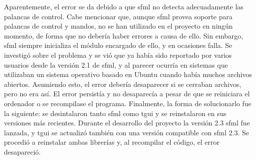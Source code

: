 	Aparentemente, el error se da debido a que \acrshort{sfml} no detecta adecuadamente las palancas de control. Cabe mencionar que, aunque \acrshort{sfml} provea soporte para palancas de control y mandos, no se han utilizado en el proyecto en ningún momento, de forma que no debería haber errores a causa de ello. Sin embargo, \acrshort{sfml} siempre inicializa el módulo encargado de ello, y en ocasiones falla. Se investigó sobre el problema y se vió que ya había sido reportado por varios usuarios desde la versión 2.1 de \acrshort{sfml}, y al parecer ocurría en sistemas que utilizaban un sistema operativo basado en Ubuntu cuando había muchos archivos abiertos. Asumiendo esto, el error debería desaparecer si se cerraban archivos, pero no era así. El error persistía y no desaparecía a pesar de que se reiniciara el ordenador o se recompilase el programa. Finalmente, la forma de solucionarlo fue la siguiente: se desintalaron tanto \acrshort{sfml} como \acrshort{tgui} y se reinstalaron en sus versiones más recientes. Durante el desarrollo del proyecto la versión 2.3 \acrshort{sfml} fue lanzada, y \acrshort{tgui} se actualizó también con una versión compatible con \acrshort{sfml} 2.3. Se procedió a reinstalar ambas librerías y, al recompilar el código, el error desapareció.

